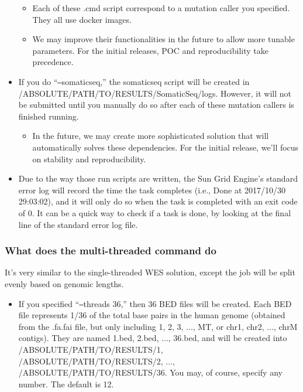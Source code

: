 \documentclass[10pt,letterpaper]{article}
\begin{document}
\begin{sloppypar}
\begin{itemize}
    \begin{itemize}
    \item Each of these .cmd script correspond to a mutation caller you specified. They all use docker images.
    \item We may improve their functionalities in the future to allow more tunable parameters. For the initial releases, POC and reproducibility take precedence.
    \end{itemize}
  
  \item
  If you do ``\texttt{--}somaticseq,'' the somaticseq script will be created in /ABSOLUTE/PATH/TO/RESULTS/SomaticSeq/logs. However, it will not be submitted until you manually do so after each of these mutation callers is finished running. 
      
    \begin{itemize}
    \item   
     In the future, we may create more sophisticated solution that will automatically solves these dependencies. For the initial release, we'll focus on stability and reproducibility. 
    \end{itemize}
  
  \item
  Due to the way those run scripts are written, the Sun Grid Engine's standard error log will record the time the task completes (i.e., Done at 2017/10/30 29:03:02), and it will only do so when the task is completed with an exit code of 0. It can be a quick way to check if a task is done, by looking at the final line of the standard error log file.

\end{itemize}



\subsubsection{What does the multi-threaded command do}
It's very similar to the single-threaded WES solution, except the job will be split evenly based on genomic lengths.

\begin{itemize}
  \item
  If you specified ``\texttt{--}threads 36,'' then 36 BED files will be created. Each BED file represents 1/36 of the total base pairs in the human genome (obtained from the .fa.fai file, but only including 1, 2, 3, ..., MT, or chr1, chr2, ..., chrM contigs). They are named 1.bed, 2.bed, ..., 36.bed, and will be created into /ABSOLUTE/PATH/TO/RESULTS/1, /ABSOLUTE/PATH/TO/RESULTS/2, ..., /ABSOLUTE/PATH/TO/RESULTS/36. You may, of course, specify any number. The default is 12.


\end{itemize}
\end{sloppypar}
\end{document}
